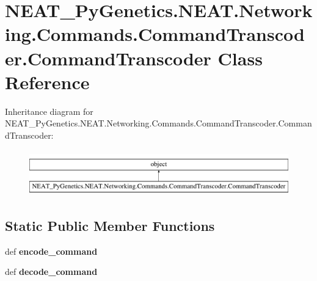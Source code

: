 \hypertarget{class_n_e_a_t___py_genetics_1_1_n_e_a_t_1_1_networking_1_1_commands_1_1_command_transcoder_1_1_command_transcoder}{}\section{N\+E\+A\+T\+\_\+\+Py\+Genetics.\+N\+E\+A\+T.\+Networking.\+Commands.\+Command\+Transcoder.\+Command\+Transcoder Class Reference}
\label{class_n_e_a_t___py_genetics_1_1_n_e_a_t_1_1_networking_1_1_commands_1_1_command_transcoder_1_1_command_transcoder}
Inheritance diagram for N\+E\+A\+T\+\_\+\+Py\+Genetics.\+N\+E\+A\+T.\+Networking.\+Commands.\+Command\+Transcoder.\+Command\+Transcoder\+:\begin{figure}[H]
\begin{center}
\leavevmode
\includegraphics[height=2.000000cm]{class_n_e_a_t___py_genetics_1_1_n_e_a_t_1_1_networking_1_1_commands_1_1_command_transcoder_1_1_command_transcoder}
\end{center}
\end{figure}
\subsection*{Static Public Member Functions}
\begin{DoxyCompactItemize}
\item 
def {\bfseries encode\+\_\+command}\hypertarget{class_n_e_a_t___py_genetics_1_1_n_e_a_t_1_1_networking_1_1_commands_1_1_command_transcoder_1_1_command_transcoder_a173c5fa30eabf9dc236f761803dfd1df}{}\label{class_n_e_a_t___py_genetics_1_1_n_e_a_t_1_1_networking_1_1_commands_1_1_command_transcoder_1_1_command_transcoder_a173c5fa30eabf9dc236f761803dfd1df}

\item 
def {\bfseries decode\+\_\+command}\hypertarget{class_n_e_a_t___py_genetics_1_1_n_e_a_t_1_1_networking_1_1_commands_1_1_command_transcoder_1_1_command_transcoder_aebdcf1865dd3c040c341f00e88c8d387}{}\label{class_n_e_a_t___py_genetics_1_1_n_e_a_t_1_1_networking_1_1_commands_1_1_command_transcoder_1_1_command_transcoder_aebdcf1865dd3c040c341f00e88c8d387}

\end{DoxyCompactItemize}
